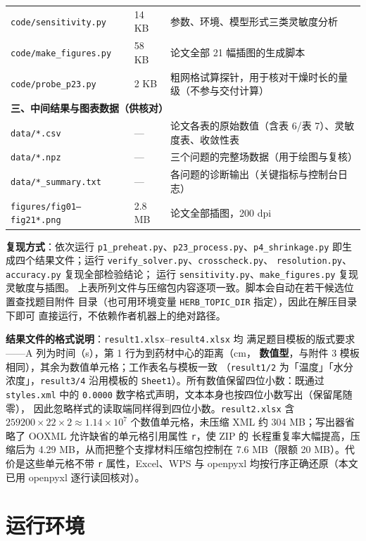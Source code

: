 {\begin{longtable}{p{}p{}p{}}
\texttt{code/sensitivity.py} & 14 KB & 参数、环境、模型形式三类灵敏度分析 \\
\texttt{code/make\_figures.py} & 58 KB & 论文全部 21 幅插图的生成脚本 \\
\texttt{code/probe\_p23.py} & 2 KB & 粗网格试算探针，用于核对干燥时长的量级（不参与交付计算） \\
\midrule
\multicolumn{3}{l}{\textbf{三、中间结果与图表数据（供核对）}} \\
\texttt{data/*.csv} & --- & 论文各表的原始数值（含表 6/表 7）、灵敏度表、收敛性表 \\
\texttt{data/*.npz} & --- & 三个问题的完整场数据（用于绘图与复核） \\
\texttt{data/*\_summary.txt} & --- & 各问题的诊断输出（关键指标与控制台日志） \\
\texttt{figures/fig01--fig21*.png} & 2.8 MB & 论文全部插图，200 dpi \\
\end{longtable}
}

\textbf{复现方式}：依次运行
\texttt{p1\_preheat.py}、\texttt{p23\_process.py}、\texttt{p4\_shrinkage.py}
即生成四个结果文件；运行 \texttt{verify\_solver.py}、\texttt{crosscheck.py}、
\texttt{resolution.py}、\texttt{accuracy.py} 复现全部检验结论；
运行 \texttt{sensitivity.py}、\texttt{make\_figures.py} 复现灵敏度与插图。
上表所列文件与压缩包内容逐项一致。脚本会自动在若干候选位置查找题目附件
目录（也可用环境变量 \texttt{HERB\_TOPIC\_DIR} 指定），因此在解压目录下即可
直接运行，不依赖作者机器上的绝对路径。

\textbf{结果文件的格式说明}：\texttt{result1.xlsx}--\texttt{result4.xlsx} 均
满足题目模板的版式要求——A 列为时间（s），第 1 行为到药材中心的距离（cm，
\textbf{数值型}，与附件 3 模板相同），其余为数值单元格；工作表名与模板一致
（\texttt{result1/2} 为「温度」「水分浓度」，\texttt{result3/4} 沿用模板的
\texttt{Sheet1}）。所有数值保留四位小数：既通过 \texttt{styles.xml} 中的
\texttt{0.0000} 数字格式声明，文本本身也按四位小数写出（保留尾随零），
因此忽略样式的读取端同样得到四位小数。\texttt{result2.xlsx} 含
$259200\times22\times2\approx1.14\times10^{7}$ 个数值单元格，未压缩 XML 约
304 MB；写出器省略了 OOXML 允许缺省的单元格引用属性 \texttt{r}，使 ZIP 的
长程重复率大幅提高，压缩后为 4.29 MB，从而把整个支撑材料压缩包控制在
7.6 MB（限额 20 MB）。代价是这些单元格不带 \texttt{r} 属性，Excel、WPS 与
openpyxl 均按行序正确还原（本文已用 openpyxl 逐行读回核对）。

\section{运行环境}\label{app:env}

